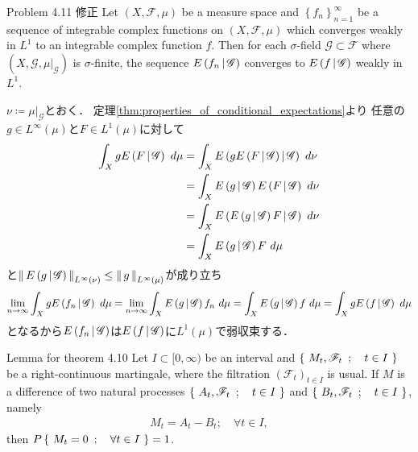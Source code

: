	\begin{itembox}[l]{Problem 4.11 修正}
		Let $(X,\mathscr{F},\mu)$ be a measure space and  
		$\left\{f_n\right\}_{n=1}^\infty$ be a sequence of integrable complex functions on $(X,\mathscr{F},\mu)$
		which converges weakly in $L^1$ to an integrable complex function $f$.
		Then for each $\sigma$-field $\mathscr{G} \subset \mathscr{F}$
		where $(X,\mathscr{G},\left.\mu\right|_{\mathscr{G}})$ is $\sigma$-finite,
		the sequence $E\left( f_n \, \middle|\, \mathscr{G} \right)$ converges to $E\left( f \, \middle|\, \mathscr{G} \right)$ weakly in $L^1$.
	\end{itembox}
	
	\begin{prf}
		$\nu \coloneqq \left.\mu\right|_{\mathscr{G}}$とおく．
		定理\ref{thm:properties_of_conditional_expectations}より
		任意の$g \in L^\infty(\mu)$と$F \in L^1(\mu)$に対して
		\begin{align}
			\int_X g\cexp{F}{\mathscr{G}}\ d\mu
			&= \int_X \cexp{g\cexp{F}{\mathscr{G}}}{\mathscr{G}}\ d\nu \\
			&= \int_X \cexp{g}{\mathscr{G}}\cexp{F}{\mathscr{G}}\ d\nu \\
			&= \int_X \cexp{\cexp{g}{\mathscr{G}}F}{\mathscr{G}}\ d\nu \\
			&= \int_X \cexp{g}{\mathscr{G}}F\ d\mu
		\end{align}
		と$\left\|\, E\left( g \, \middle|\, \mathscr{G} \right)\, \right\|_{L^\infty(\nu)} \leq \left\|\, g\, \right\|_{L^\infty(\mu)}$が成り立ち
		\begin{align}
			\lim_{n \to \infty} \int_X gE\left( f_n \, \middle|\, \mathscr{G} \right)\ d\mu
			= \lim_{n \to \infty} \int_X E\left( g \, \middle|\, \mathscr{G} \right)f_n\ d\mu
			= \int_X E\left( g \, \middle|\, \mathscr{G} \right)f\ d\mu
			= \int_X gE\left( f \, \middle|\, \mathscr{G} \right)\ d\mu
		\end{align}
		となるから$E\left( f_n \, \middle|\, \mathscr{G} \right)$は$E\left( f \, \middle|\, \mathscr{G} \right)$に$L^1(\mu)$で弱収束する．
		\QED
	\end{prf}
	
	\begin{itembox}[l]{Lemma for theorem 4.10}\label{lem:uniqueness_of_Doob_Meyer_decomposition}
		Let $I \subset [0,\infty)$ be an interval and 
		$\left\{\ M_t,\mathscr{F}_t\ \, ; \quad t \in I\ \right\}$ be a right-continuous martingale,
		where the filtration $(\mathscr{F}_t)_{t \in I}$ is usual.
		If $M$ is a difference of two natural processes 
		$\left\{\ A_t,\mathscr{F}_t\ \, ; \quad t \in I\ \right\}$
		and $\left\{\ B_t,\mathscr{F}_t\ \, ; \quad t \in I\ \right\}$, namely
		\begin{align}
			M_t = A_t - B_t; \quad \forall t \in I,
		\end{align}
		then $P\left\{\ M_t = 0\ \, ; \quad \forall t \in I\ \right\} = 1$.
	\end{itembox}
	
